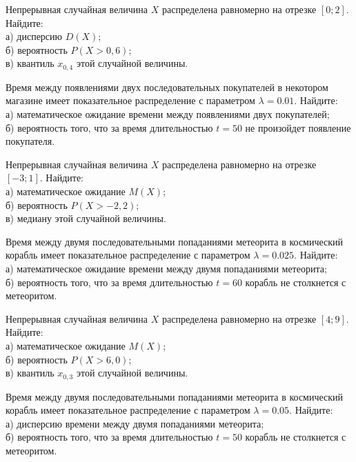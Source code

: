 \vfill

\newpage\setcounter{zad}{0}

\z Непрерывная случайная величина $X$ распределена равномерно на отрезке $[0; 2]$. Найдите: \\ \quad а) дисперсию $D(X)$; \\ \quad б) вероятность $P(X>0{,}6)$; \\ \quad в) квантиль $x_{0{,}4}$ этой случайной величины.


\vfill

\z Время между появлениями двух последовательных покупателей в некотором магазине имеет показательное распределение с параметром $\lambda = 0.01$. Найдите: \\ \quad а) математическое ожидание времени между появлениями двух покупателей; \\ \quad б) вероятность того, что за время длительностью $t = 50$ не произойдет появление покупателя.
 

\vfill

\newpage\setcounter{zad}{0}

\z Непрерывная случайная величина $X$ распределена равномерно на отрезке $[-3; 1]$. Найдите: \\ \quad а) математическое ожидание $M(X)$; \\ \quad б) вероятность $P(X>-2{,}2)$; \\ \quad в) медиану этой случайной величины.


\vfill

\z Время между двумя последовательными попаданиями метеорита в космический корабль имеет показательное распределение с параметром $\lambda = 0.025$. Найдите: \\ \quad а) математическое ожидание времени между двумя попаданиями метеорита; \\ \quad б) вероятность того, что за время длительностью $t = 60$ корабль не столкнется с метеоритом.
 

\vfill

\newpage\setcounter{zad}{0}

\z Непрерывная случайная величина $X$ распределена равномерно на отрезке $[4; 9]$. Найдите: \\ \quad а) математическое ожидание $M(X)$; \\ \quad б) вероятность $P(X>6{,}0)$; \\ \quad в) квантиль $x_{0{,}3}$ этой случайной величины.


\vfill

\z Время между двумя последовательными попаданиями метеорита в космический корабль имеет показательное распределение с параметром $\lambda = 0.05$. Найдите: \\ \quad а) дисперсию времени между двумя попаданиями метеорита; \\ \quad б) вероятность того, что за время длительностью $t = 50$ корабль не столкнется с метеоритом.
 

